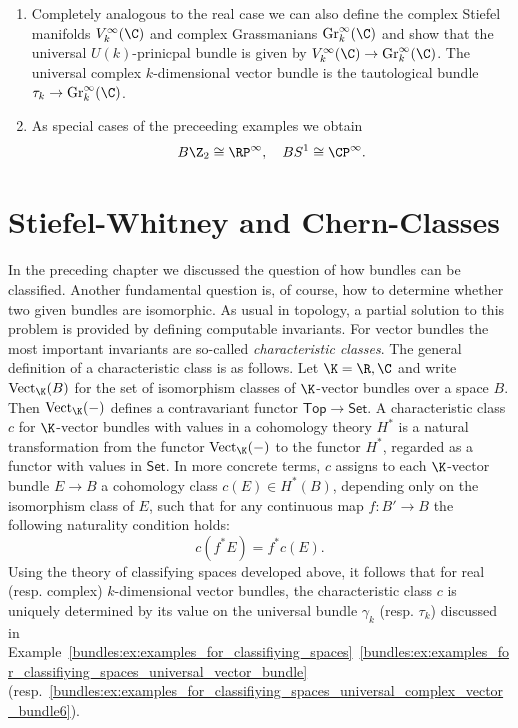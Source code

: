 \begin{example}
\begin{enumerate}[label=(\roman*)]
        
        \item \label{bundles:ex:examples_for_classifiying_spaces_universal_complex_vector_bundle}Completely analogous to the real case we can also define the complex Stiefel manifolds $V_k^\infty(\C)$ and complex Grassmanians $\mathrm{Gr}_k^\infty(\C)$ and show that the universal $U(k)$-prinicpal bundle is given by $V_k^\infty(\C) \to \mathrm{Gr}_k^\infty(\C)$. The universal complex $k$-dimensional vector bundle is the tautological bundle $\tau_k \to \mathrm{Gr}_k^\infty(\C)$. 
        \item \label{bundles:es:examples_for_classifying_spaces_special_case}As special cases of the preceeding examples we obtain
        \[
        B\Z_2 \cong \RP^\infty, \quad BS^1 \cong \CP^\infty. 
        \]
    \end{enumerate}
\end{example}



\section{Stiefel-Whitney and Chern-Classes}

In the preceding chapter we discussed the question of how bundles can be classified. Another fundamental question is, of course, how to determine whether two given bundles are isomorphic. As usual in topology, a partial solution to this problem is provided by defining computable invariants. For vector bundles the most important invariants are so-called \textit{characteristic classes}. The general definition of a characteristic class is as follows. Let $\K = \R, \C$ and write $\mathrm{Vect}_\K(B)$ for the set of isomorphism classes of $\K$-vector bundles over a space $B$. Then $\mathrm{Vect}_\K(-)$ defines a contravariant functor $\mathsf{Top} \to \mathsf{Set}$. A characteristic class $c$ for $\K$-vector bundles with values in a cohomology theory $H^\ast$ is a natural transformation from the functor $\mathrm{Vect}_\K(-)$ to the functor $H^\ast$, regarded as a functor with values in $\mathsf{Set}$. In more concrete terms, $c$ assigns to each $\K$-vector bundle $E \to B$ a cohomology class $c(E) \in H^\ast(B)$, depending only on the isomorphism class of $E$, such that for any continuous map $f \colon B' \to B$ the following naturality condition holds:
\[
c(f^\ast E) = f^\ast c(E).
\]
Using the theory of classifying spaces developed above, it follows that for real (resp. complex) $k$-dimensional vector bundles, the characteristic class $c$ is uniquely determined by its value on the universal bundle $\gamma_k$ (resp. $\tau_k$) discussed in Example~\ref{bundles:ex:examples_for_classifiying_spaces}~\ref{bundles:ex:examples_for_classifiying_spaces_universal_vector_bundle} (resp.~\ref{bundles:ex:examples_for_classifiying_spaces_universal_complex_vector_bundle6}).

